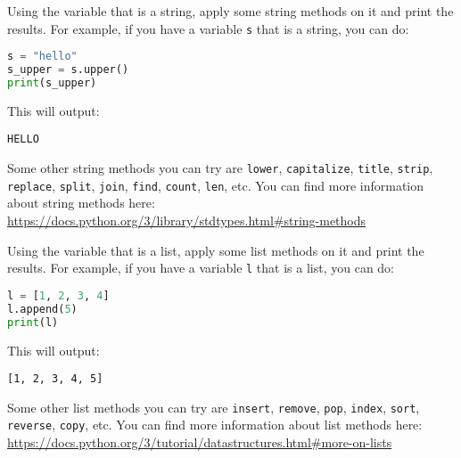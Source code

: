 \documentclass{homework}
\begin{document}
\newpage
\begin{problem}

Using the variable that is a string, apply some string methods on it and print the results. For example, if you have a variable \texttt{s} that is a string, you can do:

\begin{lstlisting}[language=Python]
s = "hello"
s_upper = s.upper()
print(s_upper)
\end{lstlisting}

This will output:

\begin{lstlisting}[style=output]
HELLO
\end{lstlisting}

Some other string methods you can try are \texttt{lower}, \texttt{capitalize}, \texttt{title}, \texttt{strip}, \texttt{replace}, \texttt{split}, \texttt{join}, \texttt{find}, \texttt{count}, \texttt{len}, etc. You can find more information about string methods here:\\

\url{https://docs.python.org/3/library/stdtypes.html#string-methods}

\end{problem}

\begin{problem}

Using the variable that is a list, apply some list methods on it and print the results. For example, if you have a variable \texttt{l} that is a list, you can do:

\begin{lstlisting}[language=Python]
l = [1, 2, 3, 4]
l.append(5)
print(l)
\end{lstlisting}

This will output:

\begin{lstlisting}[style=output]
[1, 2, 3, 4, 5]
\end{lstlisting}

Some other list methods you can try are \texttt{insert}, \texttt{remove}, \texttt{pop}, \texttt{index}, \texttt{sort}, \texttt{reverse}, \texttt{copy}, etc. You can find more information about list methods here:\\

\url{https://docs.python.org/3/tutorial/datastructures.html#more-on-lists}
\end{problem}
\end{document}
